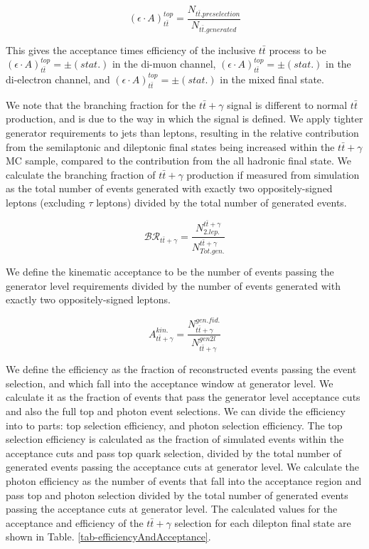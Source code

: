 \begin{equation}
	(\epsilon \cdot A)_{t\bar{t}}^{top} = \frac{N_{t\bar{t}.preselection}}{N_{t\bar{t}.generated}} 
\end{equation}

This gives the acceptance times efficiency of the inclusive $t\bar{t}$ process to be $(\epsilon \cdot A)_{t\bar{t}}^{top} =   \pm  (stat.)$ in the di-muon channel, $(\epsilon \cdot A)_{t\bar{t}}^{top} =  \pm  (stat.)$ in the di-electron channel, and $(\epsilon \cdot A)_{t\bar{t}}^{top} =  \pm  (stat.)$ in the mixed final state.

We note that the branching fraction for the $t\bar{t}+\gamma$ signal is different to normal $t\bar{t}$ production, and is due to the way in which the signal is defined.  We apply tighter generator requirements to jets than leptons, resulting in the relative contribution from the semilaptonic and dileptonic final states being increased within the $t\bar{t}+\gamma$ MC sample, compared to the contribution from the all hadronic final state. We calculate the branching fraction of $t\bar{t}+\gamma$ production if measured from simulation as the total number of events generated with exactly two oppositely-signed leptons (excluding $\tau$ leptons) divided by the total number of generated events. 

\begin{equation}
\mathcal{BR}_{t\bar{t}+\gamma} = \frac{N_{2. lep.}^{t\bar{t}+\gamma}}{N_{Tot. gen.}^{t\bar{t}+\gamma}}
\end{equation} 

We define the kinematic acceptance to be the number of events passing the generator level requirements divided by the number of events generated with exactly two oppositely-signed leptons.

\begin{equation}
A_{t\bar{t}+\gamma}^{kin.} = \frac{N_{t\bar{t}+\gamma}^{gen. fid.}}{N_{t\bar{t}+\gamma}^{gen 2l}}
\end{equation} 


We define the efficiency as the fraction of reconstructed events passing the event selection, and which fall into the acceptance window at generator level. We calculate it as the fraction of events that pass the generator level acceptance cuts and also the full top and photon event selections. We can divide the efficiency into to parts: top selection efficiency, and photon selection efficiency. The top selection efficiency is calculated as the fraction of simulated events within the acceptance cuts and pass top quark selection, divided by the total number of generated events passing the acceptance cuts at generator level. We calculate the photon efficiency as the number of events that fall into the acceptance region and pass top and photon selection divided by the total number of generated events passing the acceptance cuts at generator level. The calculated values for the acceptance and efficiency of the $t\bar{t}+\gamma$ selection for each dilepton final state are shown in Table. \ref{tab-efficiencyAndAcceptance}.

